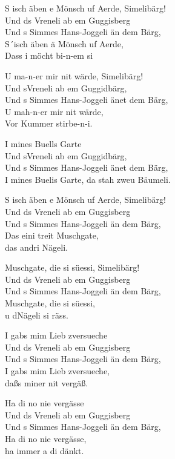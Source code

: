 \documentclass[
  letterpaper,
]{scrbook}
\begin{document}
S isch äben e Mönsch uf Aerde, Simelibärg!\\
Und ds Vreneli ab em Guggisberg\\
Und s Simmes Hans-Joggeli än dem Bärg,\\
S´isch äben ä Mönsch uf Aerde,\\
Dass i möcht bi-n-em si

U ma-n-er mir nit wärde, Simelibärg!\\
Und s\textquotesingle Vreneli ab em Guggidbärg,\\
Und s\textquotesingle{} Simmes Hans-Joggeli änet dem Bärg,\\
U mah-n-er mir nit wärde,\\
Vor Kummer stirbe-n-i.

I mines Buells Garte\\
Und s\textquotesingle Vreneli ab em Guggidbärg,\\
Und s\textquotesingle{} Simmes Hans-Joggeli änet dem Bärg,\\
I mines Buelis Garte, da stah zweu Bäumeli.

S isch äben e Mönsch uf Aerde, Simelibärg!\\
Und ds Vreneli ab em Guggisberg\\
Und s Simmes Hans-Joggeli än dem Bärg,\\
Das eini treit Muschgate,\\
das andri Nägeli.

Muschgate, die si süessi, Simelibärg!\\
Und ds Vreneli ab em Guggisberg\\
Und s Simmes Hans-Joggeli än dem Bärg,\\
Muschgate, die si süessi,\\
u d\textquotesingle Nägeli si räss.

I gabs mim Lieb z\textquotesingle versueche\\
Und ds Vreneli ab em Guggisberg\\
Und s Simmes Hans-Joggeli än dem Bärg,\\
I gabs mim Lieb z\textquotesingle versueche,\\
daßs miner nit vergäß.

Ha di no nie vergässe\\
Und ds Vreneli ab em Guggisberg\\
Und s Simmes Hans-Joggeli än dem Bärg,\\
Ha di no nie vergässe,\\
ha immer a di dänkt.
\end{document}
